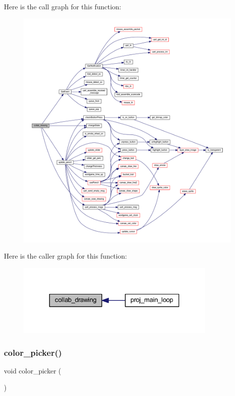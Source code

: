 Here is the call graph for this function\+:
\nopagebreak
\begin{figure}[H]
\begin{center}
\leavevmode
\includegraphics[width=350pt]{group__pengoo_gaa5d8d3d5af977d3d9e7141bf2693c81e_cgraph}
\end{center}
\end{figure}
Here is the caller graph for this function\+:\nopagebreak
\begin{figure}[H]
\begin{center}
\leavevmode
\includegraphics[width=278pt]{group__pengoo_gaa5d8d3d5af977d3d9e7141bf2693c81e_icgraph}
\end{center}
\end{figure}
\mbox{\label{group__pengoo_ga178ee685108a5f6164bf1c1757040ee2}} 
\subsubsection{\texorpdfstring{color\+\_\+picker()}{color\_picker()}}
{\footnotesize\ttfamily void color\+\_\+picker (\begin{DoxyParamCaption}{ }\end{DoxyParamCaption})}



